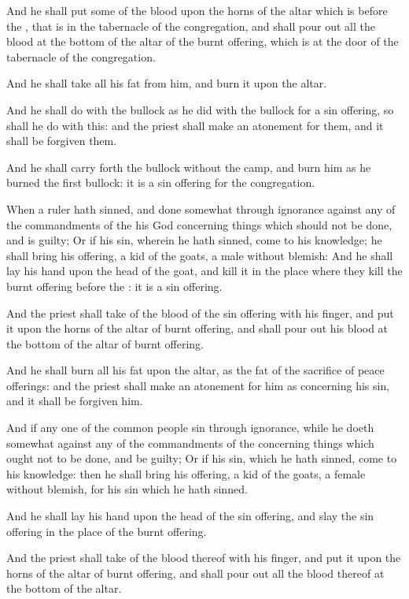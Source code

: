 \verse And he shall put some of the blood upon the horns of the altar which is before the \LORD, that is in the tabernacle of the congregation, and shall pour out all the blood at the bottom of the altar of the burnt offering, which is at the door of the tabernacle of the congregation.

\verse And he shall take all his fat from him, and burn it upon the altar.

\verse And he shall do with the bullock as he did with the bullock for a sin offering, so shall he do with this: and the priest shall make an atonement for them, and it shall be forgiven them.

\verse And he shall carry forth the bullock without the camp, and burn him as he burned the first bullock: it is a sin offering for the congregation.

\verse When a ruler hath sinned, and done somewhat through ignorance against any of the commandments of the \LORD his God concerning things which should not be done, and is guilty; \verse Or if his sin, wherein he hath sinned, come to his knowledge; he shall bring his offering, a kid of the goats, a male without blemish: \verse And he shall lay his hand upon the head of the goat, and kill it in the place where they kill the burnt offering before the \LORD: it is a sin offering.

\verse And the priest shall take of the blood of the sin offering with his finger, and put it upon the horns of the altar of burnt offering, and shall pour out his blood at the bottom of the altar of burnt offering.

\verse And he shall burn all his fat upon the altar, as the fat of the sacrifice of peace offerings: and the priest shall make an atonement for him as concerning his sin, and it shall be forgiven him.

\verse And if any one of the common people sin through ignorance, while he doeth somewhat against any of the commandments of the \LORD concerning things which ought not to be done, and be guilty; \verse Or if his sin, which he hath sinned, come to his knowledge: then he shall bring his offering, a kid of the goats, a female without blemish, for his sin which he hath sinned.

\verse And he shall lay his hand upon the head of the sin offering, and slay the sin offering in the place of the burnt offering.

\verse And the priest shall take of the blood thereof with his finger, and put it upon the horns of the altar of burnt offering, and shall pour out all the blood thereof at the bottom of the altar.

